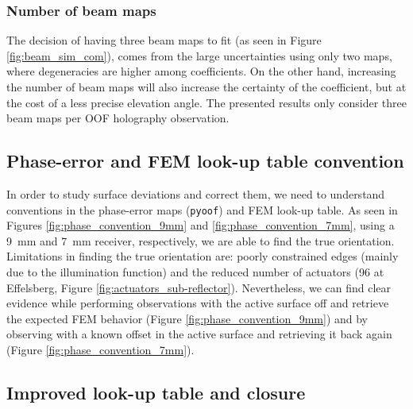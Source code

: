 \documentclass[
    ]
    {aa}
\newenvironment{NOTE}[1][\unskip]{%
\par
\medskip
\noindent
\color{red}\bfseries{NOTE #1:}
\noindent}
{}
\begin{document}
    \subsubsection{Number of beam maps}
    The decision of having three beam maps to fit (as seen in Figure \ref{fig:beam_sim_com}), comes from the large uncertainties using only two maps, where degeneracies are higher among coefficients. On the other hand, increasing the number of beam maps will also increase the certainty of the coefficient, but at the cost of a less precise elevation angle. The presented results only consider three beam maps per OOF holography observation.

    \subsection{Phase-error and FEM look-up table convention}
    \label{sec:phase-error_and_fem_look-up_table_convention}

    In order to study surface deviations and correct them, we need to understand conventions in the phase-error maps (\texttt{pyoof}) and FEM look-up table. As seen in Figures \ref{fig:phase_convention_9mm} and \ref{fig:phase_convention_7mm}, using a \SI{9}{\milli\metre} and \SI{7}{\mm} receiver, respectively, we are able to find the true orientation. Limitations in finding the true orientation are: poorly constrained edges (mainly due to the illumination function) and the reduced number of actuators (\num{96} at Effelsberg, Figure \ref{fig:actuators_sub-reflector}). Nevertheless, we can find clear evidence while performing observations with the active surface off and retrieve the expected FEM behavior (Figure \ref{fig:phase_convention_9mm}) and by observing with a known offset in the active surface and retrieving it back again (Figure \ref{fig:phase_convention_7mm}).


    \subsection{Improved look-up table and closure}
    \label{sec:improved_look-up_table_and_closure}
\end{document}
